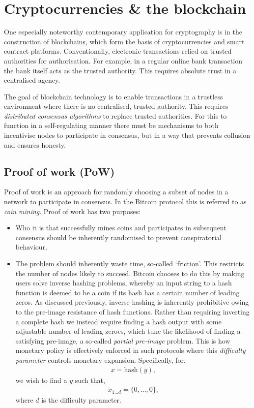 \section{Cryptocurrencies \& the blockchain} \label{cryptocurrencies-the-blockchain}

One especially noteworthy contemporary application for cryptography is in the construction of blockchains, which form the basis of cryptocurrencies and smart contract platforms. Conventionally, electronic transactions relied on trusted authorities for authorisation. For example, in a regular online bank transaction the bank itself acts as the trusted authority. This requires absolute trust in a centralised agency.

The goal of blockchain technology is to enable transactions in a trustless environment where there is no centralised, trusted authority. This requires \emph{distributed consensus algorithms} to replace trusted authorities. For this to function in a self-regulating manner there must be mechanisms to both incentivise nodes to participate in consensus, but in a way that prevents collusion and ensures honesty.

\subsection{Proof of work (PoW)}

Proof of work is an approach for randomly choosing a subset of nodes in a network to participate in consensus. In the Bitcoin protocol \cite{bib:NakamotoS} this is referred to as \emph{coin mining}. Proof of work has two purposes:
\begin{itemize}
	\item Who it is that successfully mines coins and participates in subsequent consensus should be inherently randomised to prevent conspiratorial behaviour.
	\item The problem should inherently waste time, so-called `friction'. This restricts the number of nodes likely to succeed. Bitcoin chooses to do this by making users solve inverse hashing problems, whereby an input string to a hash function is deemed to be a coin if its hash has a certain number of leading zeros. As discussed previously, inverse hashing is inherently prohibitive owing to the pre-image resistance of hash functions. Rather than requiring inverting a complete hash we instead require finding a hash output with some adjustable number of leading zeroes, which tune the likelihood of finding a satisfying pre-image, a so-called \emph{partial pre-image} problem. This is how monetary policy is effectively enforced in such protocols where this \emph{difficulty parameter} controls monetary expansion. Specifically, for,
		\begin{align} \label{eq:pow_1}
			x=\mathrm{hash}(y),
		\end{align}
		we wish to find a $y$ such that,
		\begin{align} \label{eq:pow_2}
			x_{1\dots d}=\{0,\dots,0\},
		\end{align}
		where $d$ is the difficulty parameter.
\end{itemize}

